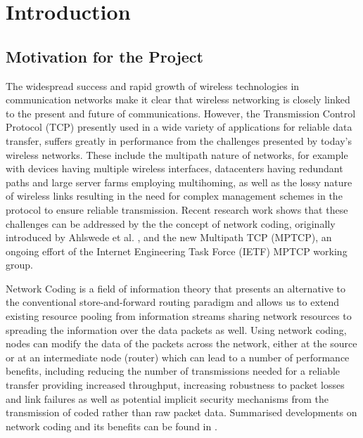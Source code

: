 \documentclass[12pt,a4paper,twoside,openright]{report}
\begin{document}

\pagestyle{headings}

\chapter{Introduction} \label{ch:intro}

\section{Motivation for the Project}

The widespread success and rapid growth of wireless technologies in communication networks make it clear that wireless networking is closely linked to the present and future of communications. However, the Transmission Control Protocol (TCP) presently used in a wide variety of applications for reliable data transfer, suffers greatly in performance from the challenges presented by today's wireless networks. These include the multipath nature of networks, for example with devices having multiple wireless interfaces, datacenters having redundant paths and large server farms employing multihoming, as well as the lossy nature of wireless links resulting in the need for complex management schemes in the protocol to ensure reliable transmission. Recent research work shows that these challenges can be addressed by the the concept of network coding, originally introduced by Ahlswede et al. \cite{ahlswede}, and the new Multipath TCP (MPTCP)\cite{mptcp-ietf}, an ongoing effort of the Internet Engineering Task Force (IETF) MPTCP working group.

Network Coding is a field of information theory that presents an alternative to the conventional store-and-forward routing paradigm and allows us to extend existing resource pooling from information streams sharing network resources to spreading the information over the data packets as well. Using network coding, nodes can modify the data of the packets across the network, either at the source or at an intermediate node (router) which can lead to a number of performance benefits, including reducing the number of transmissions needed for a reliable transfer providing increased throughput, increasing robustness to packet losses and link failures as well as potential implicit security mechanisms from the transmission of coded rather than raw packet data. Summarised developments on network coding and its benefits can be found in \cite{nc-intro}.
\end{document}
